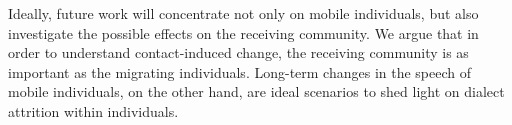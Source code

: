 \documentclass[output=paper,
modfonts
]{langscibook}
\begin{document}
% 
% 
% 
% 
% 
% 
% 
% 
% 
% 
Ideally, future work will concentrate not only on mobile individuals, but also investigate the possible effects on the receiving community. We argue that in order to understand contact-induced change, the receiving community is as important as the migrating individuals. Long-term changes in the speech of mobile individuals, on the other hand, are ideal scenarios to shed light on dialect attrition within individuals.
\end{document}
